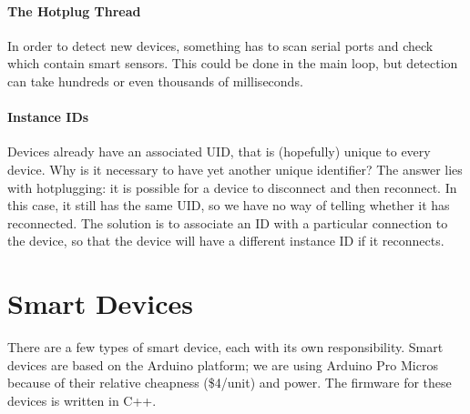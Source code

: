 \documentclass[12pt]{book}
\begin{document}
\paragraph{The Hotplug Thread}
In order to detect new devices, something has to scan serial ports
and check which contain smart sensors. This could be done in the
main loop, but detection can take hundreds or even thousands of
milliseconds.

\paragraph{Instance IDs}
Devices already have an associated UID, that is (hopefully) unique
to every device. Why is it necessary to have yet another
unique identifier? The answer lies with hotplugging: it is
possible for a device to disconnect and then reconnect.
In this case, it still has the same UID, so we have no way
of telling whether it has reconnected. The solution is to associate
an ID with a particular connection to the device, so that the device
will have a different instance ID if it reconnects.

\section{Smart Devices}
There are a few types of smart device, each with its own responsibility.
Smart devices are based on the Arduino platform; we are using
Arduino Pro Micros because of their relative cheapness (\$4/unit)
and power. The firmware for these devices is written in C++.
\end{document}
